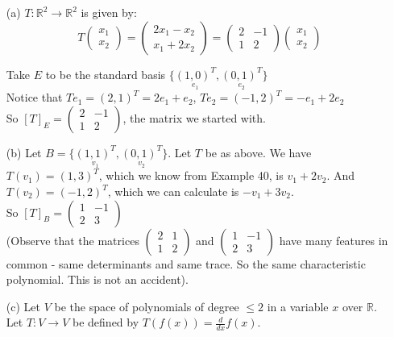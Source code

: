 \begin{examples}
\begin{itemize}
\item[(a)] $T: \mathbb{R}^2 \to \mathbb{R}^2$ is given by:
\[
T\begin{pmatrix}
x_1 \\ x_2
\end{pmatrix}
=
\begin{pmatrix}
2x_1 - x_2 \\ x_1 + 2x_2
\end{pmatrix}
= 
\begin{pmatrix}
2 & -1 \\ 1 & 2 
\end{pmatrix}\begin{pmatrix}
x_1 \\ x_2
\end{pmatrix}
\]


Take $E$ to be the standard basis $\{\underset{e_1}{(1,0)^T},\underset{e_2}{(0,1)^T}\}$\\
Notice that $Te_1 = (2,1)^T = 2e_1 + e_2$, $Te_2 = (-1,2)^T = -e_1 + 2e_2$\\

So $[T]_E = \begin{pmatrix}
 2 & -1 \\ 1 & 2
 \end{pmatrix}
$, the matrix we started with. 

\item[(b)] Let $B = \{\underset{v_1}{(1,1)^T},\underset{v_2}{(0,1)^T}\}$. Let $T$ be as above. We have $T(v_1) = (1,3)^T$, which we know from Example 40, is $v_1 + 2v_2$. And $T(v_2) = (-1,2)^T$, which we can calculate is $-v_1 + 3v_2$.\\
 So $[T]_B = \begin{pmatrix}
 1 & -1 \\ 2 & 3
 \end{pmatrix}$\\

 (Observe that the matrices $\begin{pmatrix}
 2 & 1 \\ 1 & 2
 \end{pmatrix}$ and $\begin{pmatrix}
 1 & -1 \\ 2 & 3
 \end{pmatrix}$ have many features in common - same determinants and same trace. So the same characteristic polynomial. This is not an accident). 

\item[(c)] Let $V$ be the space of polynomials of degree $\leq 2$ in a variable $x$ over $\mathbb{R}$. Let $T: V \to V$ be defined by $T(f(x)) = \frac{d}{dx}f(x)$.\\


\end{itemize}
\end{examples}

